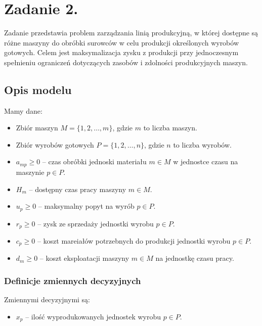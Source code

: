 \documentclass[11pt,a4paper]{article}
\numberwithin{equation}{section}
\begin{document}
\section{Zadanie 2.}
Zadanie przedstawia problem zarządzania linią produkcyjną, w której dostępne są różne maszyny do obróbki surowców w celu produkcji określonych wyrobów gotowych. Celem jest maksymalizacja zysku z produkcji przy jednoczesnym spełnieniu ograniczeń dotyczących zasobów i zdolności produkcyjnych maszyn.
\subsection{Opis modelu}
Mamy dane:
\begin{itemize}
    \item Zbiór maszyn $M = \{1, 2, \ldots, m\}$, gdzie $m$ to liczba maszyn.
    \item Zbiór wyrobów gotowych $P = \{1, 2, \ldots, n\}$, gdzie $n$ to liczba wyrobów.
    \item $a_{mp} \geq 0$ -- czas obróbki jednoski materiału $m \in M$ w jednostce czasu na maszynie $p \in P$.
    \item $H_m$ -- dostępny czas pracy maszyny $m \in M$.
    \item $u_p \geq 0$ -- maksymalny popyt na wyrób $p \in P$.
    \item $r_p \geq 0$ -- zysk ze sprzedaży jednostki wyrobu $p \in P$.
    \item $c_p \geq 0$ -- koszt mareiałów potrzebnych do produkcji jednostki wyrobu $p \in P$.
    \item $d_m \geq 0$ -- koszt eksploatacji maszyny $m \in M$ na jednostkę czasu pracy.
\end{itemize}

\subsubsection{Definicje zmiennych decyzyjnych}
Zmiennymi decyzyjnymi są:
\begin{itemize}
    \item $x_p$ -- ilość wyprodukowanych jednostek wyrobu $p \in P$.
\end{itemize}
\newcommand{\nM}{3} %
\newcommand{\nP}{4} %
\end{document}
